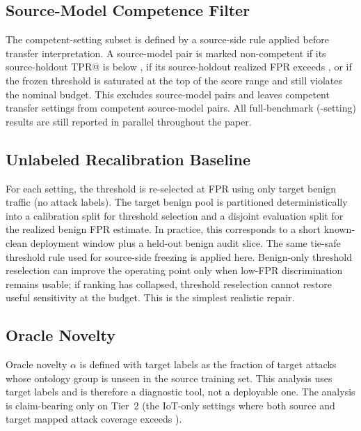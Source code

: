 \documentclass[10pt,conference]{IEEEtran}
\begin{document}
\subsection{Source-Model Competence Filter}

The competent-setting subset is defined by a source-side rule applied before transfer interpretation. A source-model pair is marked non-competent if its source-holdout TPR@\FrozenFprTarget{} is below \SourceCompetenceTprFloor{}, if its source-holdout realized FPR exceeds \SourceCompetenceFprCeiling{}, or if the frozen threshold is saturated at the top of the score range and still violates the nominal \FrozenFprTarget{} budget. This excludes \NonCompetentSourcePairCount{} source-model pairs and leaves \CompetentSettingCount{} competent transfer settings from \CompetentSourcePairCount{} competent source-model pairs. All full-benchmark (\NaturalSettingCount{}-setting) results are still reported in parallel throughout the paper.



\subsection{Unlabeled Recalibration Baseline}

For each setting, the threshold is re-selected at \FrozenFprTarget{} FPR using only target benign traffic (no attack labels). The target benign pool is partitioned deterministically into a calibration split for threshold selection and a disjoint evaluation split for the realized benign FPR estimate. In practice, this corresponds to a short known-clean deployment window plus a held-out benign audit slice. The same tie-safe threshold rule used for source-side freezing is applied here. Benign-only threshold reselection can improve the operating point only when low-FPR discrimination remains usable; if ranking has collapsed, threshold reselection cannot restore useful sensitivity at the \FrozenFprTarget{} budget. This is the simplest realistic repair.

\subsection{Oracle Novelty}
\label{sec:oracle-novelty-def}

Oracle novelty $\alpha$ is defined with target labels as the fraction of target attacks whose ontology group is unseen in the source training set. This analysis uses target labels and is therefore a diagnostic tool, not a deployable one. The analysis is claim-bearing only on Tier~2 (the \PrimaryIotSettingCount{} IoT-only settings where both source and target mapped attack coverage exceeds \NoveltyCoverageFloor{}).
\end{document}
